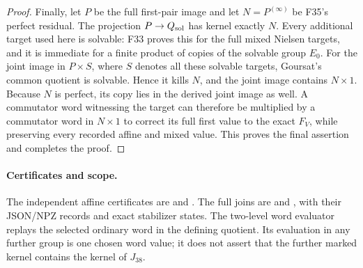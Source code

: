 \begin{proof}
Finally, let $P$ be the full first-pair image and let
$N=P^{(\infty)}$ be F35's perfect residual. The projection
$P\to Q_{\rm sol}$ has kernel exactly $N$. Every additional
target used here is solvable: F33 proves this for the full
mixed Nielsen targets, and it is immediate for a finite
product of copies of the solvable group $E_0$. For the joint
image in $P\times S$, where $S$ denotes all these solvable
targets, Goursat's common quotient is solvable. Hence it
kills $N$, and the joint image contains $N\times1$.
Because $N$ is perfect, its copy lies in the derived joint
image as well. A commutator word witnessing the target can
therefore be multiplied by a commutator word in $N\times1$
to correct its full first value to the exact $F_V$, while
preserving every recorded affine and mixed value. This
proves the final assertion and completes the proof.
\end{proof}

\paragraph{Certificates and scope.}
The independent affine certificates are
and .
The full joins are
and ,
with their JSON/NPZ records and exact stabilizer states.
The two-level word evaluator
replays the selected ordinary word in the defining quotient.
Its evaluation in any further group is one chosen word
value; it does not assert that the further marked kernel
contains the kernel of $J_{38}$.

